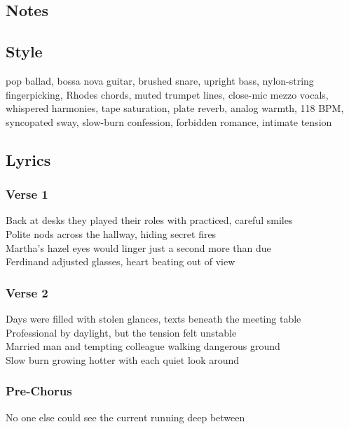\subsection{Notes}\label{notes-41}

\subsection{Style}\label{style-40}

pop ballad, bossa nova guitar, brushed snare, upright bass, nylon-string
fingerpicking, Rhodes chords, muted trumpet lines, close-mic mezzo
vocals, whispered harmonies, tape saturation, plate reverb, analog
warmth, 118 BPM, syncopated sway, slow-burn confession, forbidden
romance, intimate tension

\subsection{Lyrics}\label{lyrics-40}

\subsubsection{Verse 1}\label{verse-1-32}

Back at desks they played their roles with practiced, careful smiles\\
Polite nods across the hallway, hiding secret fires\\
Martha's hazel eyes would linger just a second more than due\\
Ferdinand adjusted glasses, heart beating out of view

\subsubsection{Verse 2}\label{verse-2-32}

Days were filled with stolen glances, texts beneath the meeting table\\
Professional by daylight, but the tension felt unstable\\
Married man and tempting colleague walking dangerous ground\\
Slow burn growing hotter with each quiet look around

\subsubsection{Pre-Chorus}\label{pre-chorus-64}

No one else could see the current running deep between

